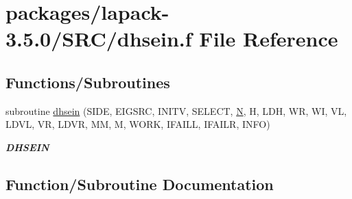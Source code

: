 \hypertarget{dhsein_8f}{}\section{packages/lapack-\/3.5.0/\+S\+R\+C/dhsein.f File Reference}
\label{dhsein_8f}
\subsection*{Functions/\+Subroutines}
\begin{DoxyCompactItemize}
\item 
subroutine \hyperlink{dhsein_8f_a44914030dd5a6f0b946c21228febec47}{dhsein} (S\+I\+D\+E, E\+I\+G\+S\+R\+C, I\+N\+I\+T\+V, S\+E\+L\+E\+C\+T, \hyperlink{polmisc_8c_a0240ac851181b84ac374872dc5434ee4}{N}, H, L\+D\+H, W\+R, W\+I, V\+L, L\+D\+V\+L, V\+R, L\+D\+V\+R, M\+M, M, W\+O\+R\+K, I\+F\+A\+I\+L\+L, I\+F\+A\+I\+L\+R, I\+N\+F\+O)
\begin{DoxyCompactList}\small\item\em {\bfseries D\+H\+S\+E\+I\+N} \end{DoxyCompactList}\end{DoxyCompactItemize}


\subsection{Function/\+Subroutine Documentation}
\hypertarget{dhsein_8f_a44914030dd5a6f0b946c21228febec47}{}
